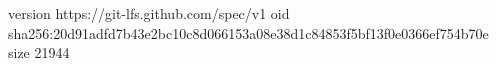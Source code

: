 version https://git-lfs.github.com/spec/v1
oid sha256:20d91adfd7b43e2bc10c8d066153a08e38d1c84853f5bf13f0e0366ef754b70e
size 21944
